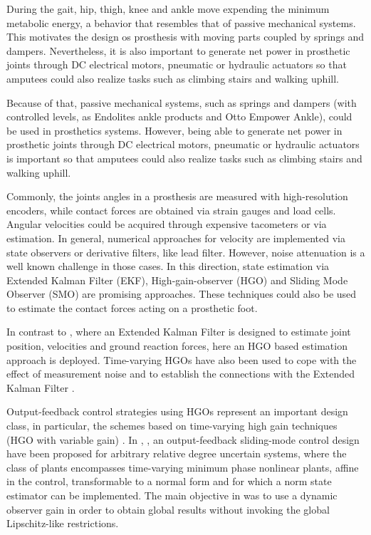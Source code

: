 \documentclass[letterpaper, 10 pt, conference]{ieeeconf}  %
\theoremstyle{plain}
\theoremstyle{definition}
\theoremstyle{remark}
\begin{document}
During the gait, hip, thigh, knee and ankle move expending the minimum metabolic energy, a behavior that resembles that of passive mechanical systems. This motivates the design os prosthesis with moving parts coupled by springs and dampers. Nevertheless, it is also important to generate net power in prosthetic joints through DC electrical motors, pneumatic or hydraulic actuators \cite{Goldfarb2008} \cite{Bedard2002} so that amputees could also realize tasks such as climbing stairs and walking uphill.

Because of that, passive mechanical systems, such as springs and dampers (with controlled levels, as Endolites ankle products and Otto Empower Ankle), could be used in prosthetics systems. However, being able to generate net power in prosthetic joints through DC electrical motors, pneumatic or hydraulic actuators \cite{Goldfarb2008} \cite{Bedard2002} is important so that amputees could also realize tasks such as climbing stairs and walking uphill.

Commonly, the joints angles in a prosthesis are measured with high-resolution encoders, while contact forces are obtained via strain gauges and load cells. Angular velocities could be acquired through expensive tacometers or via estimation. In general, numerical approaches for velocity are implemented via state observers or derivative filters, like lead filter. However,  noise attenuation  is a well known challenge in those cases. In this direction, state estimation via Extended Kalman Filter (EKF), High-gain-observer (HGO) and Sliding Mode Observer (SMO) are promising approaches. These techniques could also be used to estimate the contact forces acting on a prosthetic foot.

In contrast to \cite{Fakoorian2016}, where an Extended Kalman Filter is designed to estimate joint position, velocities and ground reaction forces, here an HGO based estimation approach is deployed. Time-varying HGOs have also been used to cope with the effect of measurement noise and to establish the connections with the Extended Kalman Filter \cite{AK:07} \cite{AK:09}. 

Output-feedback control strategies using HGOs \cite{OK:97} represent an important design class, in particular, the schemes based on time-varying high gain
techniques (HGO with variable gain) \cite{P:01}\cite{KKJ:02}
\cite{KKC:03}\cite{LL:05}\cite{AK:07}. In \cite{POH:2011}, \cite{PHCL:2007}, an output-feedback sliding-mode control design have been proposed for arbitrary relative degree uncertain systems, where the class of plants encompasses time-varying minimum phase nonlinear plants, affine
in the control, transformable to a normal form and for which a
norm state estimator can be implemented. The main objective in \cite{POH:2011} was to use a dynamic observer gain in order to obtain global results without invoking the global Lipschitz-like restrictions. 
\end{document}
